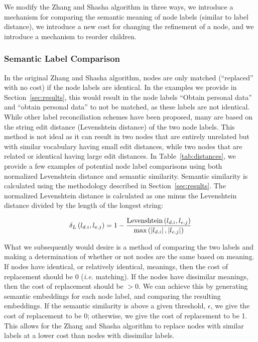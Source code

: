 We modify the Zhang and Shasha algorithm in three ways, we introduce a mechanism for comparing the semantic meaning of node labels (similar to label distance), we introduce a new cost for changing the refinement of a node, and we introduce a mechanism to reorder children.

\subsubsection{Semantic Label Comparison}
In the original Zhang and Shasha algorithm, nodes are only matched (``replaced'' with no cost) if the node labels are identical. In the examples we provide in Section~\ref{sec:results}, this would result in the node labels ``Obtain personal data'' and ``obtain personal data'' to not be matched, as these labels are not identical. While other label reconciliation schemes have been proposed, many are based on the string edit distance (Levenshtein distance) of the two node labels. This method is not ideal as it can result in two nodes that are entirely unrelated but with similar vocabulary having small edit distances, while two nodes that are related or identical having large edit distances. In Table~\ref{tab:distances}, we provide a few examples of potential node label comparisons using both normalized Levenshtein distance and semantic similarity. Semantic similarity is calculated using the methodology described in Section~\ref{sec:results}. The normalized Levenshtein distance is calculated as one minus the Levenshtein distance divided by the length of the longest string:

\[
    \delta_L\left(l_{{d}.{i}}, l_{{e}.{j}}\right) = 1 - \frac{\text{Levenshtein}\left(l_{{d}.{i}}, l_{{e}.{j}}\right)}{\max\left(\left|l_{{d}.{i}}\right|, \left|l_{{e}.{j}}\right|\right)}
\]




What we subsequently would desire is a method of comparing the two labels and making a determination of whether or not nodes are the same based on meaning. If nodes have identical, or relatively identical, meanings, then the cost of replacement should be 0 (\textit{i.e.} matching). If the nodes have dissimilar meanings, then the cost of replacement should be $>0$. We can achieve this by generating semantic embeddings for each node label, and comparing the resulting embeddings. If the semantic similarity is above a given threshold, $\epsilon$, we give the cost of replacement to be 0; otherwise, we give the cost of replacement to be 1. This allows for the Zhang and Shasha algorithm to replace nodes with similar labels at a lower cost than nodes with dissimilar labels.

